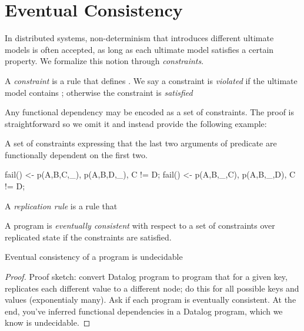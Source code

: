 \section{Eventual Consistency}

In distributed systems, non-determinism that introduces different ultimate models is often accepted, as long as each ultimate model satisfies a certain property.  We formalize this notion through {\em constraints}.

\begin{definition}
A {\em constraint} is a rule that defines .  We say a constraint is {\em violated} if the ultimate model contains ; otherwise the constraint is {\em satisfied}
\end{definition}

Any functional dependency may be encoded as a set of constraints.  The proof is straightforward so we omit it and instead provide the following example:

\begin{example}
A set of constraints expressing that the last two arguments of predicate  are functionally dependent on the first two.

\begin{Dedalus}
fail() <- p(A,B,C,_), p(A,B,D,_), C != D;
fail() <- p(A,B,_,C), p(A,B,_,D), C != D;
\end{Dedalus}
\end{example}

\begin{definition}
A {\em replication rule} is a rule that 
\end{definition}

\begin{definition}
A \lang program is {\em eventually consistent} with respect to a set of constraints over replicated state if the constraints are satisfied.
\end{definition}


\begin{lemma}
Eventual consistency of a \lang program is undecidable
\end{lemma}
\begin{proof}
Proof sketch: convert Datalog program to \lang program that for a given key, replicates each different value to a different node; do this for all possible keys and values (exponentialy many).  Ask if each program is eventually consistent.  At the end, you've inferred functional dependencies in a Datalog program, which we know is undecidable.
\end{proof}

